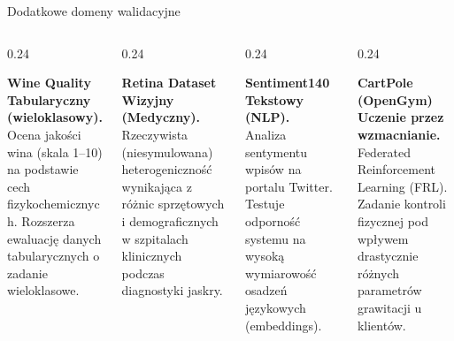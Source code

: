 \documentclass[9pt,aspectratio=169]{beamer}
\begin{document}
\begin{frame}{Dodatkowe domeny walidacyjne}
\begin{columns}[T]
\begin{column}{0.24\textwidth}
\begin{cardpurple}[height=4.3cm]
\textbf{\footnotesize Wine Quality}\\[3pt]
\tiny \textbf{Tabularyczny (wieloklasowy).}\\[2pt]
Ocena jakości wina (skala 1--10) na podstawie cech fizykochemicznych. Rozszerza ewaluację danych tabularycznych o zadanie wieloklasowe.
\end{cardpurple}
\end{column}
\begin{column}{0.24\textwidth}
\begin{cardgreen}[height=4.3cm]
\textbf{\footnotesize Retina Dataset}\\[3pt]
\tiny \textbf{Wizyjny (Medyczny).}\\[2pt]
Rzeczywista (niesymulowana) heterogeniczność wynikająca z różnic sprzętowych i demograficznych w szpitalach klinicznych podczas diagnostyki jaskry.
\end{cardgreen}
\end{column}
\begin{column}{0.24\textwidth}
\begin{cardorange}[height=4.3cm]
\textbf{\footnotesize Sentiment140}\\[3pt]
\tiny \textbf{Tekstowy (NLP).}\\[2pt]
Analiza sentymentu wpisów na portalu Twitter. Testuje odporność systemu na wysoką wymiarowość osadzeń językowych (embeddings).
\end{cardorange}
\end{column}
\begin{column}{0.24\textwidth}
\begin{cardpurple}[height=4.3cm]
\textbf{\footnotesize CartPole (OpenGym)}\\[3pt]
\tiny \textbf{Uczenie przez wzmacnianie.}\\[2pt]
Federated Reinforcement Learning (FRL). Zadanie kontroli fizycznej pod wpływem drastycznie różnych parametrów grawitacji u klientów.
\end{cardpurple}
\end{column}
\end{columns}
\end{frame}
\end{document}
